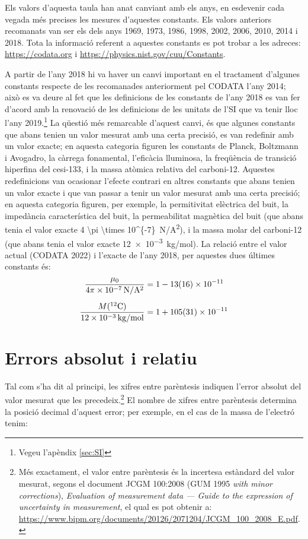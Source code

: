 Els valors d'aquesta taula  han anat canviant amb els anys, en esdevenir cada vegada més precises les mesures d'aquestes constants. Els valors anteriors recomanats van ser els dels anys 1969, 1973, 1986, 1998, 2002, 2006, 2010, 2014 i 2018.   Tota la informació referent a aquestes constants es pot trobar   a
les adreces: \href{https://codata.org//}{https:/\!\!/codata.org} i \href{https://physics.nist.gov/cuu/Constants/}{https:/\!\!/physics.nist.gov/cuu/Constants}.


A partir de l'any 2018 hi va haver un canvi important en el tractament d'algunes constants respecte de les recomanades anteriorment pel CODATA l'any 2014; això es va deure al fet que les definicions de les constants de l'any 2018 es van fer d'acord amb la renovació de les definicions de les unitats de l'SI que va tenir lloc l'any 2019.\footnote{Vegeu l'apèndix \ref{sec:SI}} La qüestió més remarcable d'aquest canvi, és que algunes constants que abans tenien un valor mesurat amb una certa precisió, es van redefinir amb un valor exacte; en aquesta categoria figuren les constants de Planck, Boltzmann i Avogadro, la càrrega fonamental, l'eficàcia lluminosa, la freqüència de transició hiperfina del cesi-133, i la massa atòmica relativa del carboni-12. Aquestes redefinicions van ocasionar l'efecte contrari en altres constants que abans tenien un valor exacte i que van passar a tenir un valor mesurat amb una certa precisió; en aquesta categoria figuren, per exemple, la permitivitat elèctrica del buit, la impedància característica del buit, la permeabilitat  magnètica del buit (que abans tenia el valor exacte \qty[parse-numbers = false]{4 \pi \times 10^{-7}}{N/A^2}), i la massa molar del carboni-12 (que abans tenia el valor exacte \qty{12e-3}{kg/mol}). La relació entre el valor actual (CODATA 2022) i l'exacte  de l'any 2018, per aquestes dues últimes constants és:
\begin{align*}
    \frac{\mu_0}{\qty[parse-numbers = false]{4 \pi \times 10^{-7}}{N/A^2}} &= 1 - \num{13(16)e-11}\\[0.5em]
    \frac{M({}^{12}\mathrm{C})}{\qty{12e-3}{kg/mol}} &= 1 + \num{105(31)e-11}
\end{align*}



\section{Errors absolut i relatiu}\label{sec:err_abs_rel}

Tal com s'ha dit al principi, les xifres entre parèntesis indiquen l'error absolut del valor mesurat que les precedeix.\footnote{Més exactament, el valor entre parèntesis és la incertesa estàndard del valor mesurat, segons el document JCGM 100:2008 (GUM 1995 \textit{with minor
corrections}), \textit{Evaluation of measurement data --- Guide to the expression of uncertainty in
measurement}, el qual es pot obtenir a:  \href{https://www.bipm.org/documents/20126/2071204/JCGM_100_2008_E.pdf/}{https:/\!\!/www.bipm.org/documents/20126/2071204/JCGM\_100\_2008\_E.pdf}.} El nombre de xifres entre parèntesis determina la posició decimal d'aquest error; per exemple, en el cas de la  massa de l'electró tenim:

